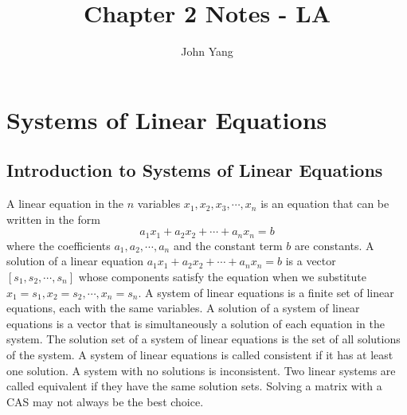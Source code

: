 \documentclass{article}
\title{Chapter 2 Notes - LA} %
\author{John Yang}
\begin{document}
    \maketitle
    \tableofcontents
    \section{Systems of Linear Equations} %
    \subsection{Introduction to Systems of Linear Equations}
    \begin{outline}
        \1 A linear equation in the $n$ variables \(x_1,x_2,x_3,\cdots,x_n\) is an equation that can be written in the form \[a_1x_1+a_2x_2+\cdots+a_nx_n=b\] where the coefficients \(a_1,a_2,\cdots,a_n\) and the constant term $b$ are constants. 
        \1 A solution of a linear equation \(a_1x_1+a_2x_2+\cdots+a_nx_n=b\) is a vector \([s_1,s_2,\cdots,s_n]\) whose components satisfy the equation when we substitute \(x_1=s_1,x_2=s_2,\cdots,x_n=s_n\). 
        \1 A system of linear equations is a finite set of linear equations, each with the same variables. A solution of a system of linear equations is a vector that is simultaneously a solution of each equation in the system. The solution set of a system of linear equations is the set of all solutions of the system. 
        \1 A system of linear equations is called consistent if it has at least one solution. A system with no solutions is inconsistent. 
        \1 Two linear systems are called equivalent if they have the same solution sets. 
        \1 Solving a matrix with a CAS may not always be the best choice. 
    \end{outline}
\end{document}
